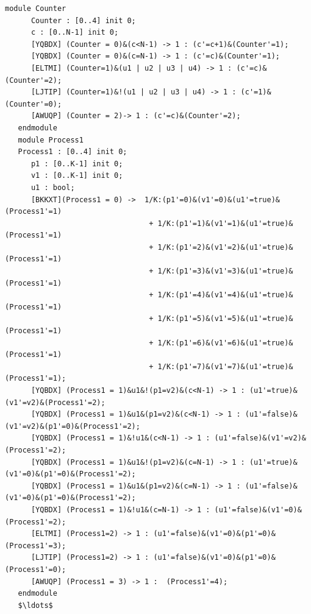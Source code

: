    \begin{lstlisting}[style=prism-color,caption={Part of the generated PRISM model for the Synchronous Leader Election Protocol},captionpos=b,label={leader-prism}]
   module Counter
      Counter : [0..4] init 0;
      c : [0..N-1] init 0;
      [YQBDX] (Counter = 0)&(c<N-1) -> 1 : (c'=c+1)&(Counter'=1);
      [YQBDX] (Counter = 0)&(c=N-1) -> 1 : (c'=c)&(Counter'=1);
      [ELTMI] (Counter=1)&(u1 | u2 | u3 | u4) -> 1 : (c'=c)&(Counter'=2);
      [LJTIP] (Counter=1)&!(u1 | u2 | u3 | u4) -> 1 : (c'=1)&(Counter'=0);
      [AWUQP] (Counter = 2)-> 1 : (c'=c)&(Counter'=2);
   endmodule
   module Process1
   Process1 : [0..4] init 0;
      p1 : [0..K-1] init 0;
      v1 : [0..K-1] init 0;
      u1 : bool;
      [BKKXT](Process1 = 0) ->  1/K:(p1'=0)&(v1'=0)&(u1'=true)&(Process1'=1) 
                                 + 1/K:(p1'=1)&(v1'=1)&(u1'=true)&(Process1'=1) 
                                 + 1/K:(p1'=2)&(v1'=2)&(u1'=true)&(Process1'=1) 
                                 + 1/K:(p1'=3)&(v1'=3)&(u1'=true)&(Process1'=1) 
                                 + 1/K:(p1'=4)&(v1'=4)&(u1'=true)&(Process1'=1) 
                                 + 1/K:(p1'=5)&(v1'=5)&(u1'=true)&(Process1'=1) 
                                 + 1/K:(p1'=6)&(v1'=6)&(u1'=true)&(Process1'=1) 
                                 + 1/K:(p1'=7)&(v1'=7)&(u1'=true)&(Process1'=1);
      [YQBDX] (Process1 = 1)&u1&!(p1=v2)&(c<N-1) -> 1 : (u1'=true)&(v1'=v2)&(Process1'=2);
      [YQBDX] (Process1 = 1)&u1&(p1=v2)&(c<N-1) -> 1 : (u1'=false)&(v1'=v2)&(p1'=0)&(Process1'=2);
      [YQBDX] (Process1 = 1)&!u1&(c<N-1) -> 1 : (u1'=false)&(v1'=v2)&(Process1'=2);
      [YQBDX] (Process1 = 1)&u1&!(p1=v2)&(c=N-1) -> 1 : (u1'=true)&(v1'=0)&(p1'=0)&(Process1'=2);
      [YQBDX] (Process1 = 1)&u1&(p1=v2)&(c=N-1) -> 1 : (u1'=false)&(v1'=0)&(p1'=0)&(Process1'=2);
      [YQBDX] (Process1 = 1)&!u1&(c=N-1) -> 1 : (u1'=false)&(v1'=0)&(Process1'=2);
      [ELTMI] (Process1=2) -> 1 : (u1'=false)&(v1'=0)&(p1'=0)&(Process1'=3);
      [LJTIP] (Process1=2) -> 1 : (u1'=false)&(v1'=0)&(p1'=0)&(Process1'=0);
      [AWUQP] (Process1 = 3) -> 1 :  (Process1'=4);
   endmodule
   $\ldots$
   \end{lstlisting}
  




